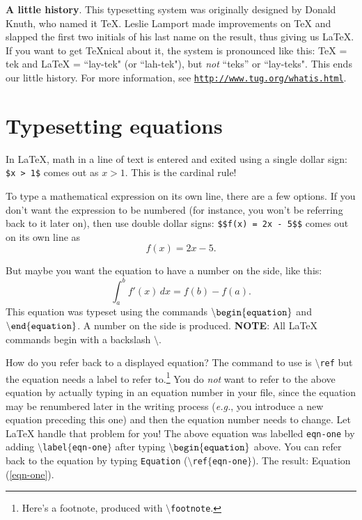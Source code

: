 \documentclass[12pt,letterpaper]{amsart}
\newcommand{\sm}{\setminus}
\newcommand{\pln}[1]{$\sm${\tt #1}}
\newcommand{\bgn}[1]{$\tt {\sm}begin\{#1\}$}
\newcommand{\nd}[1]{$\tt {\sm}end\{#1\}$}
\theoremstyle{plain}
\theoremstyle{definition}
\numberwithin{equation}{section}
\begin{document}
{\bf A little history}. This typesetting system was originally designed by Donald Knuth, 
who named it
TeX.  Leslie Lamport made improvements on TeX 
and slapped the first two initials of his last name on the result, thus giving us 
LaTeX.  If you want to get TeXnical about it, the system is pronounced 
like this: 
TeX = tek and LaTeX = ``lay-tek" (or ``lah-tek"), but {\it not} 
``teks'' or ``lay-teks". 
This ends our little history.  For more information, see 
{\color{blue}\href{http://www.tug.org/whatis.html}{\tt http://www.tug.org/whatis.html}}.



\section{Typesetting equations}\label{tsetsec}


In LaTeX, math in a line of text is entered and exited using 
a single dollar sign: {\tt \$x > 1\$} comes out as $x > 1$. 
This is the cardinal rule!  

To type a mathematical expression on its own line, 
there are a few options.
If you don't want the expression to be numbered 
(for instance, you won't be referring back to it later on), then use
double dollar signs: {\tt \$\$f(x) = 2x - 5\$\$} comes out 
on its own line as 
$$
f(x) = 2x - 5.
$$


But maybe you want the equation to have a number on the side, like this:
\begin{equation}\label{eqn-one}
\int_a^b f'(x)\,dx = f(b) - f(a).
\end{equation}
This equation was typeset 
using the commands 
\bgn{equation}
and \nd{equation}.
A number on the side is produced. 
{\bf NOTE}:  
All LaTeX commands begin with a backslash $\sm$.

How do you refer back to a displayed equation?  
The command to use is \pln{ref}
but the equation needs a label to refer to.\footnote{Here's a footnote, produced with \pln{footnote}.}
You do {\it not} want to 
refer to the above equation by actually typing 
in an equation number in your file, since the equation may be renumbered 
later in the writing process ({\it e.g.}, you introduce a new equation preceding this one) and then the equation number needs to change.  Let LaTeX handle that problem for you!
The above equation was labelled {\tt eqn-one} by adding 
{\tt $\sm$label$\{$eqn-one$\}$} after typing 
\bgn{equation} above.
You can refer back to the equation by typing 
{\tt Equation} (\pln{ref}$\{${\tt eqn-one}$\}$). The result: Equation (\ref{eqn-one}).  
\end{document}
